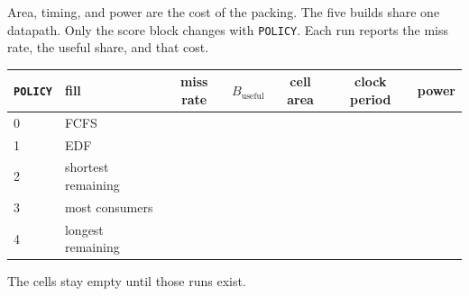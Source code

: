 \documentclass[11pt,a4paper]{article}
\begin{document}
Area, timing, and power are the cost of the packing.
The five builds share one datapath.
Only the score block changes with \texttt{POLICY}.
Each run reports the miss rate, the useful share, and that cost.

\begin{center}
\begin{tabular}{llccccc}
\toprule
\texttt{POLICY} & fill & miss rate & $B_{\mathrm{useful}}$ & cell area & clock period & power \\
\midrule
0 & FCFS & & & & & \\
1 & EDF & & & & & \\
2 & shortest remaining & & & & & \\
3 & most consumers & & & & & \\
4 & longest remaining & & & & & \\
\bottomrule
\end{tabular}
\end{center}

The cells stay empty until those runs exist.
\end{document}

